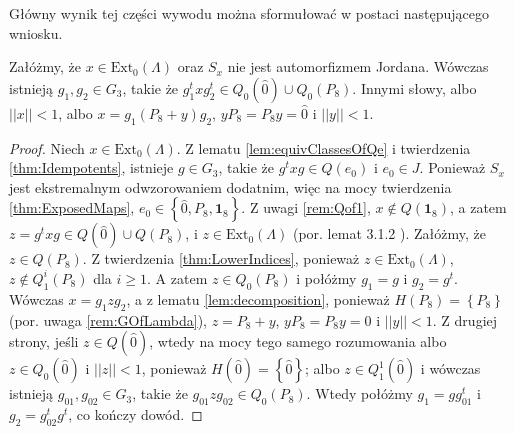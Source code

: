 {Główny wynik tej części wywodu można sformułować w postaci następującego wniosku.
\begin{Corollary}
\label{cor:q0}
    Załóżmy, że $x \in \text{Ext}_{0}(\Lambda)$ oraz $S_{x}$ nie jest
    automorfizmem Jordana.
    Wówczas istnieją $g_{1}, g_{2} \in G_{3}$,
    takie że $g_{1}^{t} x g_{2}^{t} \in Q_{0}(\hat{0}) \cup Q_{0}(P_{8})$.
    Innymi słowy, albo $||x|| < 1$,
    albo
    $x = g_{1} (P_{8} + y) g_{2}$,  $y P_{8} = P_{8} y = \hat{0}$
    i $|| y || < 1$.
\end{Corollary}
\begin{proof}
Niech $x \in  \text{Ext}_{0}(\Lambda)$.
    Z lematu \ref{lem:equivClassesOfQe} i twierdzenia \ref{thm:Idempotents},
    istnieje $g \in G_{3}$, takie że
    $g^{t} x g \in Q(e_{0})$ i $e_{0} \in J$.
    Ponieważ $S_{x}$ jest ekstremalnym odwzorowaniem dodatnim, więc na mocy
    twierdzenia \ref{thm:ExposedMaps},
    $e_{0} \in \left \{ \hat{0}, P_{8}, \mathbf{1}_{8} \right \}$.
    Z uwagi \ref{rem:Qof1}, $x \notin Q(\mathbf{1}_{8})$, a zatem
    $z = g^{t} x g \in Q(\hat{0}) \cup Q(P_{8})$,
    i $z \in \text{Ext}_{0}(\Lambda)$
    (por. lemat 3.1.2 \cite{Stormer2013}).
    Załóżmy, że $z \in Q(P_{8})$.
    Z twierdzenia \ref{thm:LowerIndices},
    ponieważ $z \in \text{Ext}_{0}(\Lambda)$,
    $z \notin Q_{1}^{i}(P_{8})$
    dla $i \geq 1$.
    A zatem $z \in Q_{0}(P_{8})$ i połóżmy $g_{1} = g$ i $g_{2} = g^{t}$.
    Wówczas $x = g_{1} z g_{2}$,
    a z lematu \ref{lem:decomposition}, ponieważ
    $H(P_{8}) = \left \{ P_{8} \right \}$
    (por. uwaga \ref{rem:GOfLambda}),
    $z = P_{8} + y$,  $y P_{8} = P_{8} y = \hat{0}$ i $||y|| < 1$.
    Z drugiej strony, jeśli $z \in Q(\hat{0})$,
    wtedy na mocy tego samego rozumowania albo $z \in Q_{0}(\hat{0})$
    i $||z|| < 1$, ponieważ $H(\hat{0}) = \left \{ \hat{0} \right \}$; albo
    $z \in Q_{1}^{1}(\hat{0})$ i wówczas istnieją $g_{01}, g_{02} \in G_{3}$,
    takie że $g_{01} z g_{02} \in Q_{0}(P_{8})$.
    Wtedy połóżmy $g_{1} = g g_{01}^{t}$ i $g_{2} = g_{02}^{t} g^{t}$,
    co kończy dowód.
\end{proof}

}
